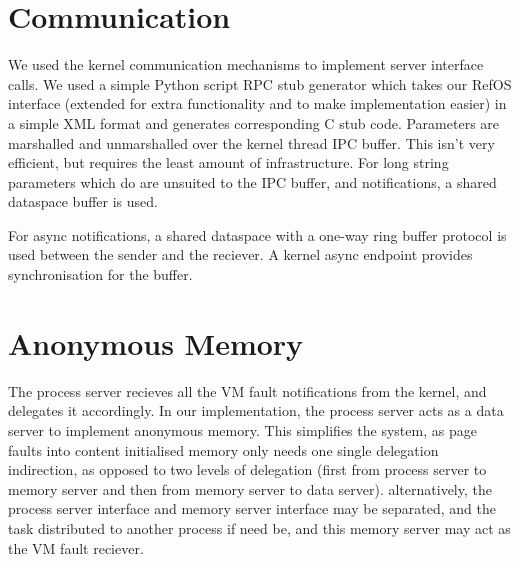 \section{Communication}

We used the kernel communication mechanisms to implement server interface calls. We used a simple
Python script RPC stub generator which takes our RefOS interface (extended for extra functionality
and to make implementation easier) in a simple XML format and generates corresponding C stub code.
Parameters are marshalled and unmarshalled over the kernel thread IPC buffer. This isn't very
efficient, but requires the least amount of infrastructure. For long string parameters which do
are unsuited to the IPC buffer, and notifications, a shared dataspace buffer is used.

For async notifications, a shared dataspace with a one-way ring buffer protocol is used between the
sender and the reciever. A kernel async endpoint provides synchronisation for the buffer.


\section{Anonymous Memory}

The process server recieves all the VM fault notifications from the kernel, and delegates it
accordingly. In our implementation, the process server acts as a data server to implement anonymous
memory. This simplifies the system, as page faults into content initialised memory only needs one
single delegation indirection, as opposed to two levels of delegation (first from process server to
memory server and then from memory server to data server).  alternatively, the process server
interface and memory server interface may be separated, and the task distributed to another process
if need be, and this memory server may act as the VM fault reciever.


